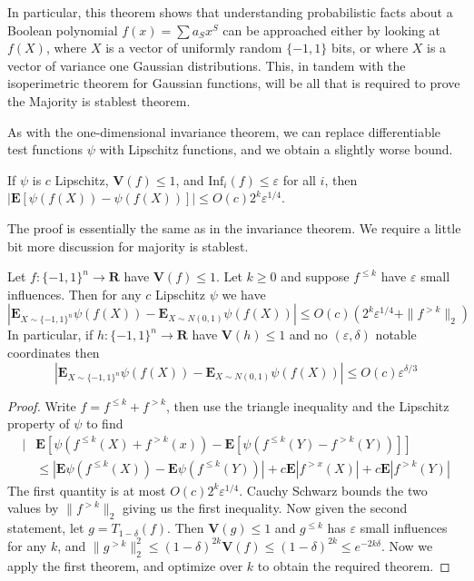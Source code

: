 In particular, this theorem shows that understanding probabilistic facts about a Boolean polynomial $f(x) = \sum a_S x^S$ can be approached either by looking at $f(X)$, where $X$ is a vector of uniformly random $\{ -1, 1 \}$ bits, or where $X$ is a vector of variance one Gaussian distributions. This, in tandem with the isoperimetric theorem for Gaussian functions, will be all that is required to prove the Majority is stablest theorem.

As with the one-dimensional invariance theorem, we can replace differentiable test functions $\psi$ with Lipschitz functions, and we obtain a slightly worse bound.

\begin{theorem}
    If $\psi$ is $c$ Lipschitz, $\mathbf{V}(f) \leq 1$, and $\text{Inf}_i(f) \leq \varepsilon$ for all $i$, then $|\mathbf{E}[\psi(f(X)) - \psi(f(X))]| \leq O(c) 2^k \varepsilon^{1/4}$.
\end{theorem}

The proof is essentially the same as in the invariance theorem. We require a little bit more discussion  for majority is stablest.

\begin{theorem}
    Let $f: \{ -1, 1 \}^n \to \mathbf{R}$ have $\mathbf{V}(f) \leq 1$. Let $k \geq 0$ and suppose $f^{\leq k}$ have $\varepsilon$ small influences. Then for any $c$ Lipschitz $\psi$ we have
    \[ \left| \mathbf{E}_{X \sim \{ -1, 1 \}^n} \psi(f(X)) - \mathbf{E}_{X \sim N(0,1)} \psi(f(X)) \right| \leq O(c)(2^k \varepsilon^{1/4} + \| f^{> k} \|_2) \]
    In particular, if $h: \{ -1, 1 \}^n \to \mathbf{R}$ have $\mathbf{V}(h) \leq 1$ and no $(\varepsilon, \delta)$ notable coordinates then
    \[ \left| \mathbf{E}_{X \sim \{ -1, 1 \}^n} \psi(f(X)) - \mathbf{E}_{X \sim N(0,1)} \psi(f(X)) \right| \leq O(c) \varepsilon^{\delta/3} \]
\end{theorem}
\begin{proof}
    Write $f = f^{\leq k} + f^{> k}$, then use the triangle inequality and the Lipschitz property of $\psi$ to find
    \begin{align*}
        |&\mathbf{E}[\psi(f^{\leq k}(X) + f^{> k}(x)) - \mathbf{E}[\psi(f^{\leq k}(Y) - f^{> k}(Y))]]\\
        &\leq |\mathbf{E} \psi(f^{\leq k}(X)) - \mathbf{E} \psi(f^{\leq k}(Y))| + c \mathbf{E}|f^{> x}(X)| + c \mathbf{E}|f^{> k}(Y)|
    \end{align*}
    The first quantity is at most $O(c)2^k \varepsilon^{1/4}$. Cauchy Schwarz bounds the two values by $\| f^{> k} \|_2$ giving us the first inequality. Now given the second statement, let $g = T_{1-\delta}(f)$. Then $\mathbf{V}(g) \leq 1$ and $g^{\leq k}$ has $\varepsilon$ small influences for any $k$, and $\| g^{> k} \|_2^2 \leq (1 - \delta)^{2k} \mathbf{V}(f) \leq (1 - \delta)^{2k} \leq e^{-2k\delta}$. Now we apply the first theorem, and optimize over $k$ to obtain the required theorem.
\end{proof}

